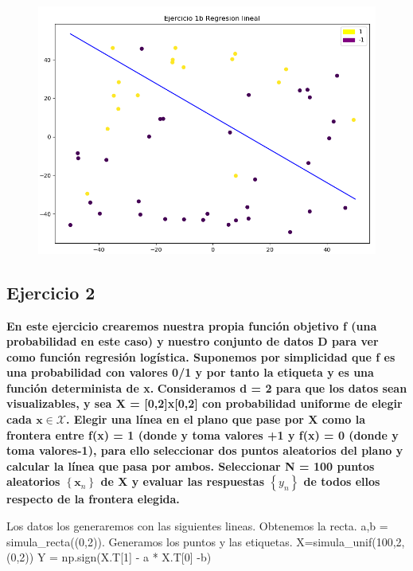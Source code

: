 \documentclass[titlepage]{article}
\begin{document}
\begin{enumerate}
		\begin{figure}[H]
			\centering
			\includegraphics[width=0.7\linewidth]{screenshot011}
			\caption{}
			\label{fig:screenshot011}
		\end{figure}
	\end{enumerate}
		
		\subsection{Ejercicio 2}
		
		\textbf{En este ejercicio crearemos nuestra propia función objetivo f (una probabilidad en este caso) y nuestro conjunto de datos D para ver como función regresión logística. Suponemos por simplicidad que f es una probabilidad con valores 0/1 y por tanto la etiqueta y es una función determinista de x.}
		\textbf{Consideramos d = 2 para que los datos sean visualizables, y sea X = [0,2]x[0,2] con probabilidad uniforme de elegir cada $\mathbf{x} \in \mathcal{X}$. Elegir una línea en el plano que pase por X como la frontera entre f(x) = 1 (donde y toma valores +1 y f(x) = 0 (donde y toma valores-1), para ello seleccionar dos puntos aleatorios del plano y calcular la línea que pasa por ambos. Seleccionar N = 100 puntos aleatorios $\left\{\mathbf{x}_{n}\right\}$ de X y evaluar las respuestas $\left\{y_{n}\right\}$ de todos ellos respecto de la frontera elegida. }
		\newline
		
		Los datos los generaremos con las siguientes lineas.
		\newline
		Obtenemos la recta.
		\newline
		a,b = simula\_recta((0,2)).
		\newline
		Generamos los puntos y las etiquetas.
		\newline
		X=simula\_unif(100,2,(0,2))
		\newline
		Y = np.sign(X.T[1] - a * X.T[0] -b)
		
\end{document}
